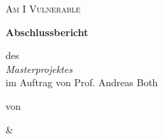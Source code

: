 \begin{titlepage}
    \centering
    \par\vspace{3cm}
    {\scshape\huge Am I Vulnerable\par}
    \vspace{1.5cm}
    {\Huge\bfseries Abschlussbericht\par}
    \vspace{2cm}
    {\Large des\\\textit{Masterprojektes}\\im Auftrag von Prof. Andreas Both\par}
    \vspace{12cm}
    von\par
    \autorFirstNameK\textsc{ \autorFamilyNameK} \par
    \& \par
    \autorFirstNameT\textsc{ \autorFamilyNameT} \par
    \vfill
\end{titlepage}
